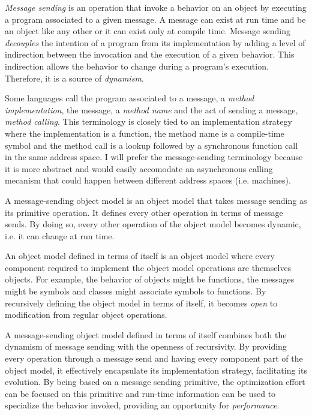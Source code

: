 \textit{Message sending} is an operation that invoke a behavior on an object by
executing a program associated to a given message.  A message can exist at run
time and be an object like any other or it can exist only at compile time.
Message sending \textit{decouples} the intention of a program from its
implementation by adding a level of indirection between the invocation and the
execution of a given behavior. This indirection allows the behavior to change
during a program's execution. Therefore, it is a source of \textit{dynamism}.

Some languages call the program associated to a message, a \textit{method
implementation}, the message, a \textit{method name} and the act of sending a
message, \textit{method calling}. This terminology is closely tied to an
implementation strategy where the implementation is a function, the method name
is a compile-time symbol and the method call is a lookup followed by a
synchronous function call in the same address space. I will prefer the
message-sending terminology because it is more abstract and would easily
accomodate an asynchronous calling mecanism that could happen between different
address spaces (i.e. machines). 

A message-sending object model is an object model that takes message sending as
its primitive operation. It defines every other operation in terms of message
sends. By doing so, every other operation of the object model becomes dynamic,
i.e. it can change at run time.

An object model defined in terms of itself is an object model where every
component required to implement the object model operations are themselves
objects. For example, the behavior of objects might be functions, the messages
might be symbols and classes might associate symbols to functions. By
recursively defining the object model in terms of itself, it becomes
\textit{open} to modification from regular object operations.

A message-sending object model defined in terms of itself combines both the
dynamism of message sending with the openness of recursivity. By providing
every operation through a message send and having every component part of the
object model, it effectively encapsulate its implementation strategy,
facilitating its evolution. By being based on a message sending primitive, the
optimization effort can be focused on this primitive and run-time information
can be used to specialize the behavior invoked, providing an opportunity for
\textit{performance}. 

